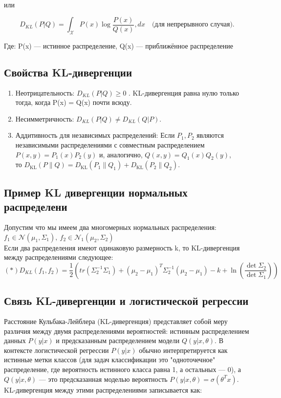 или

\[
D_{KL}(P | Q) = \int_{\mathcal{X}} P(x) \log \frac{P(x)}{Q(x)} , dx \quad \text{(для непрерывного случая)}.
\]

Где:
    P(x) — истинное распределение,
    Q(x) — приближённое распределение

\subsection*{Свойства KL-дивергенции}
\begin{enumerate}
    \item Неотрицательность: $ D_{KL}(P | Q) \geq 0 $ . KL-дивергенция равна нулю только тогда, когда P(x) = Q(x)  почти всюду.
    \item Несимметричность: $ D_{KL}(P | Q) \neq D_{KL}(Q | P) $.
    \item Аддитивность для независимых распределений:
     Если $\displaystyle P_{1},P_{2}$ являются независимыми распределениями с совместным распределением $\displaystyle P(x,y)=P_{1}(x)P_{2}(y)$ и, аналогично, $\displaystyle Q(x,y)=Q_{1}(x)Q_{2}(y)$,\\ то $\displaystyle D_{\mathrm {KL} }(P\parallel Q)=D_{\mathrm {KL} }(P_{1}\parallel Q_{1})+D_{\mathrm {KL} }(P_{2}\parallel Q_{2}).$
\end{enumerate}


\subsection*{Пример KL дивергенции нормальных распределени}
Допустим что мы имеем два многомерных нормальных распределения: $f_1 \in \mathcal{N}(\mu_1, \Sigma_1), \ f_2 \in \mathcal{N}_1(\mu_2, \Sigma_2)$
\\ 
Если два распределения имеют одинаковую размерность k, то KL-дивергенция между распределениями следующее:
\[ (*)
D_{KL}(f_1, f_2) = \frac{1}{2} (tr (\Sigma_2^{-1} \Sigma_1) + (\mu_2 - \mu_1)^T\Sigma_2^{-1}(\mu_2 - \mu_1) - k + \ln\left( \frac{\det \Sigma_2}{\det \Sigma_1} \right) )
\]

\subsection*{Связь KL-дивергенции и логистической регрессии}
Расстояние Кульбака-Лейблера (KL-дивергенция) представляет собой меру различия между двумя распределениями вероятностей: истинным распределением данных $P(y|x)$ и предсказанным распределением модели  $Q(y|x, \theta)$. В контексте логистической регрессии $P(y|x)$ обычно интерпретируется как истинные метки классов (для задач классификации это "одноточечное" 
распределение, где вероятность истинного класса равна 1, а остальных — 0), а $Q(y|x, \theta)$ — это предсказанная моделью вероятность $P(y|x, \theta) = \sigma(\theta^T x)$. KL-дивергенция между этими распределениями записывается как:

